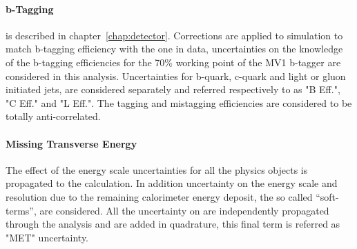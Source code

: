\paragraph{b-Tagging} is described in chapter~\ref{chap:detector}. Corrections are applied to simulation
to match b-tagging efficiency with the one in data, uncertainties on the knowledge 
of the b-tagging efficiencies for the 70\% working point of the MV1 b-tagger are
considered in this analysis. 
Uncertainties for b-quark, c-quark and light or gluon initiated jets, are considered separately and referred respectively 
to as "B  Eff.", "C Eff." and "L Eff.". The tagging and mistagging efficiencies are considered to be totally anti-correlated. 

\paragraph{Missing Transverse Energy}
The effect of the energy scale
uncertainties for all the physics objects is propagated to the \met calculation.
In addition uncertainty on the energy scale and resolution due to the remaining 
calorimeter energy deposit, the so called ``soft-terms'', are considered. All the
uncertainty on \met are independently propagated through the analysis and are
added in quadrature, this final term is referred as "MET" uncertainty.


	
